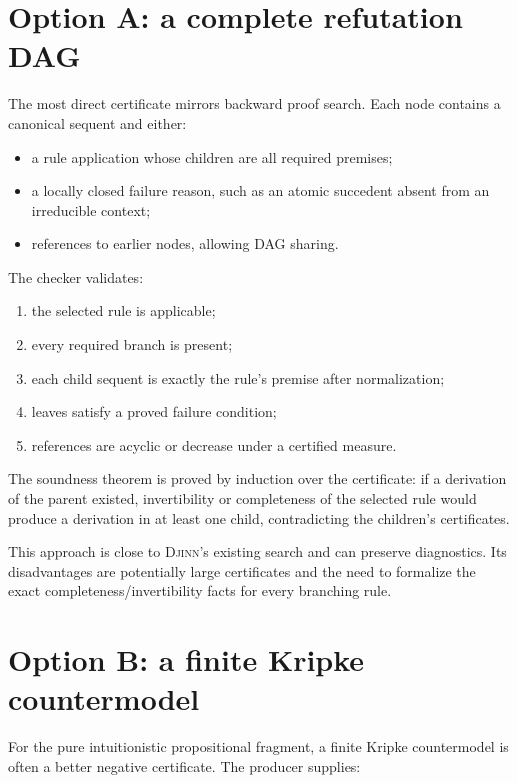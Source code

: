 \documentclass[11pt,letterpaper,openany]{report}
\theoremstyle{definition}
\theoremstyle{remark}
\newcommand{\Djinn}{\textsc{Djinn}}
\begin{document}
\section{Option A: a complete refutation DAG}
\label{sec:refutation-dag}

The most direct certificate mirrors backward proof search. Each node contains a canonical sequent and either:

\begin{itemize}
\item a rule application whose children are all required premises;
\item a locally closed failure reason, such as an atomic succedent absent from an irreducible context;
\item references to earlier nodes, allowing DAG sharing.
\end{itemize}

The checker validates:

\begin{enumerate}
\item the selected rule is applicable;
\item every required branch is present;
\item each child sequent is exactly the rule's premise after normalization;
\item leaves satisfy a proved failure condition;
\item references are acyclic or decrease under a certified measure.
\end{enumerate}

The soundness theorem is proved by induction over the certificate: if a derivation of the parent existed, invertibility or completeness of the selected rule would produce a derivation in at least one child, contradicting the children's certificates.

This approach is close to \Djinn's existing search and can preserve diagnostics. Its disadvantages are potentially large certificates and the need to formalize the exact completeness/invertibility facts for every branching rule.

\section{Option B: a finite Kripke countermodel}
\label{sec:kripke}

For the pure intuitionistic propositional fragment, a finite Kripke countermodel is often a better negative certificate. The producer supplies:
\end{document}
